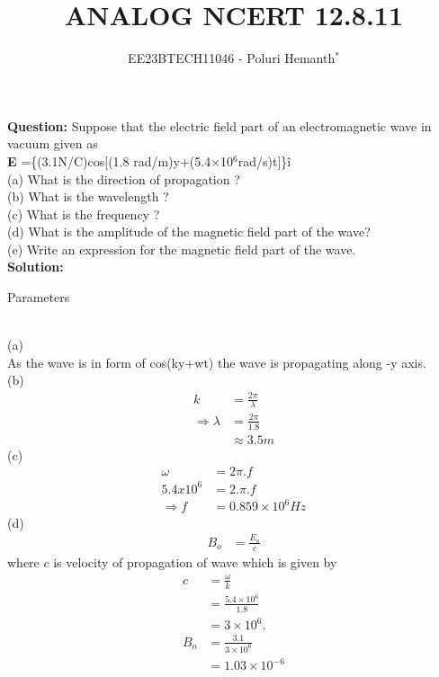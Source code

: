 \documentclass[journal,12pt,twocolumn]{IEEEtran}
\theoremstyle{remark}
\begin{document}

\vspace{3cm}

\title{ANALOG NCERT 12.8.11}
\author{EE23BTECH11046 - Poluri Hemanth$^{*}$}
\maketitle
\textbf{Question:}
Suppose that the electric field part of an electromagnetic wave
in vacuum given as\\ \textbf{E} =\{(3.1N/C)cos[(1.8 rad/m)y+(5.4$\times$10$^{6}$rad/s)t]\}\^i \\
(a) What is the direction of propagation ?\\
(b) What is the wavelength ? \\
(c) What is the frequency ?\\
(d) What is the amplitude of the magnetic field part of the wave?\\
(e) Write an expression for the magnetic field part of the wave.\\
\textbf{Solution:}
\begin{table}[h!]
    
    \caption{Parameters}
    \label{tab:12.8.11}
\end{table}\\
(a)\\
As the wave is in form of cos(ky+wt)
the wave is propagating along -y axis.\\
(b)
\begin{align}
	k&=\frac{2\pi}{\lambda} \\
	\Rightarrow\lambda&=\frac{2\pi}{1.8}\\
	&\approx3.5m
\end{align}
(c)
\begin{align} 
	\omega&=2\pi.f \\
	 5.4 x 10^{6} &=2.\pi.f \\
	\Rightarrow f &= 0.859 \times 10^{6} Hz    
\end{align}
(d)
\begin{align}
	B_o&=\frac{E_o}{c}
\end{align}
where $c$ is velocity of propagation of wave which is given by
\begin{align}
	c&=\frac{\omega}{k} \\
	&=\frac{5.4 \times 10^{6}}{1.8}\\
	&=3 \times 10^{6}.\\
	B_o&= \frac{3.1}{3 \times 10^{6}}\\
	&= 1.03 \times 10^{-6}\label{1}
\end{align}
\end{document}
